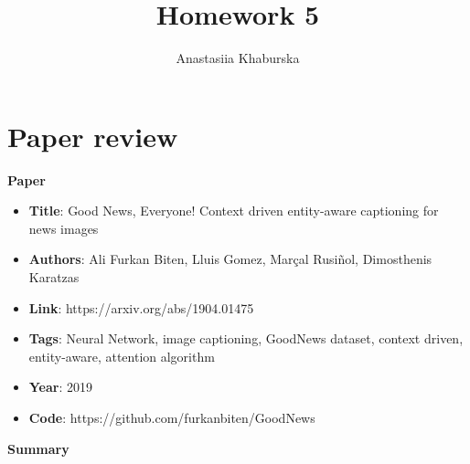 \documentclass[11pt]{article}
\title{\textbf{Homework 5}}
\author{Anastasiia Khaburska}
\date{}
\begin{document}
\maketitle

\section{Paper review}

 \textbf{Paper}
   \begin{itemize}
     \item \textbf{Title}: Good News, Everyone! Context driven entity-aware captioning for news images
     \item \textbf{Authors}: Ali Furkan Biten, Lluis Gomez, Marçal Rusiñol, Dimosthenis Karatzas
     \item \textbf{Link}: https://arxiv.org/abs/1904.01475
     \item \textbf{Tags}: Neural Network, image captioning, GoodNews dataset, context driven, entity-aware, attention algorithm
     \item \textbf{Year}: 2019
     \item \textbf{Code}: https://github.com/furkanbiten/GoodNews 
    \end{itemize}
\textbf{Summary}
\end{document}
